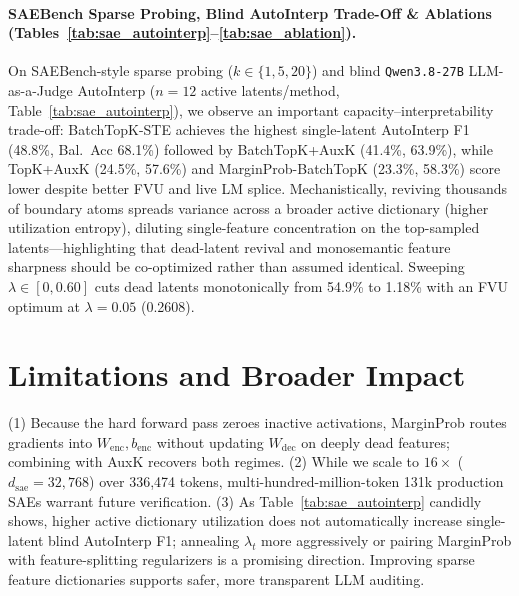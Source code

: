 \documentclass[10pt,twocolumn]{article}
\begin{document}
\paragraph{SAEBench Sparse Probing, Blind AutoInterp Trade-Off \& Ablations (Tables~\ref{tab:sae_autointerp}--\ref{tab:sae_ablation}).} On SAEBench-style sparse probing ($k \in \{1,5,20\}$) and blind \texttt{Qwen3.8-27B} LLM-as-a-Judge AutoInterp ($n=12$ active latents/method, Table~\ref{tab:sae_autointerp}), we observe an important capacity--interpretability trade-off: BatchTopK-STE achieves the highest single-latent AutoInterp F1 (48.8\%, Bal.\ Acc 68.1\%) followed by BatchTopK+AuxK (41.4\%, 63.9\%), while TopK+AuxK (24.5\%, 57.6\%) and MarginProb-BatchTopK (23.3\%, 58.3\%) score lower despite better FVU and live LM splice. Mechanistically, reviving thousands of boundary atoms spreads variance across a broader active dictionary (higher utilization entropy), diluting single-feature concentration on the top-sampled latents---highlighting that dead-latent revival and monosemantic feature sharpness should be co-optimized rather than assumed identical. Sweeping $\lambda \in [0, 0.60]$ cuts dead latents monotonically from 54.9\% to 1.18\% with an FVU optimum at $\lambda=0.05$ (0.2608).

\section{Limitations and Broader Impact}
(1) Because the hard forward pass zeroes inactive activations, MarginProb routes gradients into $W_{\mathrm{enc}}, b_{\mathrm{enc}}$ without updating $W_{\mathrm{dec}}$ on deeply dead features; combining with AuxK recovers both regimes. (2) While we scale to $16\times$ ($d_{\mathrm{sae}}=32{,}768$) over 336,474 tokens, multi-hundred-million-token 131k production SAEs warrant future verification. (3) As Table~\ref{tab:sae_autointerp} candidly shows, higher active dictionary utilization does not automatically increase single-latent blind AutoInterp F1; annealing $\lambda_t$ more aggressively or pairing MarginProb with feature-splitting regularizers is a promising direction. Improving sparse feature dictionaries supports safer, more transparent LLM auditing.



\end{document}
